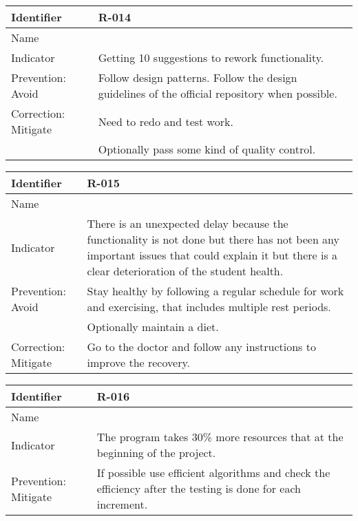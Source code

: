 \begin{table}[H]
	\begin{tabularx}{\textwidth}{|y|z|}
		\hline
		Identifier & \textbf{R-014} \\ \hline
		Name & \Rcatorce \\ \hline
		Indicator & Getting 10 suggestions to rework functionality.\\ \hline
		Prevention: Avoid & Follow design patterns. Follow the design guidelines of the official repository when possible.\\ \hline
		Correction: Mitigate
			& Need to redo and test work. \\
			& Optionally pass some kind of quality control. \\ \hline
	\end{tabularx}
\end{table}

\begin{table}[H]
	\begin{tabularx}{\textwidth}{|y|z|}
		\hline
		Identifier & \textbf{R-015} \\ \hline
		Name & \Rquince \\ \hline
		Indicator & There is an unexpected delay because the functionality is not done but there has not been any important issues that could explain it but there is a clear deterioration of the student health. \\ \hline
		Prevention: Avoid
			& Stay healthy by following a regular schedule for work and exercising, that includes multiple rest periods.\\
			& Optionally maintain a diet.\\ \hline
		Correction: Mitigate & Go to the doctor and follow any instructions to improve the recovery.\\ \hline
	\end{tabularx}
\end{table}

\begin{table}[H]
	\begin{tabularx}{\textwidth}{|y|z|}
		\hline
		Identifier & \textbf{R-016} \\ \hline
		Name & \Rdieciseis \\ \hline
		Indicator & The program takes 30\% more resources that at the beginning of the project.\\ \hline
		Prevention: Mitigate & If possible use efficient algorithms and check the efficiency after the testing is done for each increment.\\ \hline
	\end{tabularx}
\end{table}

